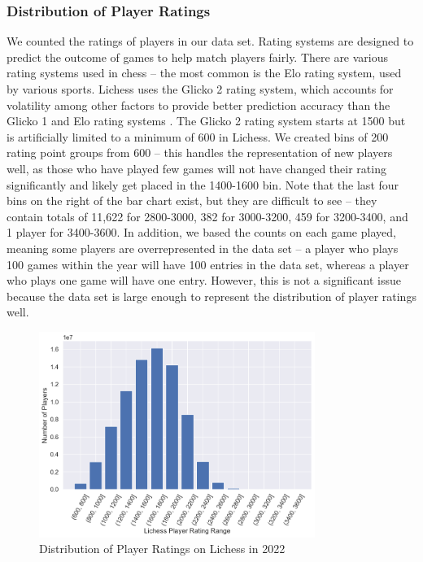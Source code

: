 \documentclass[a4paper, 11pt]{article}
\begin{document}
\subsubsection{Distribution of Player Ratings}
We counted the ratings of players in our data set. Rating systems are designed to predict the outcome of games to help match players fairly. There are various rating systems used in chess -- the most common is the Elo rating system, used by various sports. Lichess uses the Glicko 2 rating system, which accounts for volatility among other factors to provide better prediction accuracy than the Glicko 1 and Elo rating systems \cite{chessRatingSystems, DeloitteFIDEChessRatingChallenge}. The Glicko 2 rating system starts at 1500 but is artificially limited to a minimum of 600 in Lichess. We created bins of 200 rating point groups from 600 -- this handles the representation of new players well, as those who have played few games will not have changed their rating significantly and likely get placed in the 1400-1600 bin. Note that the last four bins on the right of the bar chart exist, but they are difficult to see -- they contain totals of 11,622 for 2800-3000, 382 for 3000-3200, 459 for 3200-3400, and 1 player for 3400-3600. In addition, we based the counts on each game played, meaning some players are overrepresented in the data set -- a player who plays 100 games within the year will have 100 entries in the data set, whereas a player who plays one game will have one entry. However, this is not a significant issue because the data set is large enough to represent the distribution of player ratings well.

\begin{figure}[H]
    \centering
    \caption{Distribution of Player Ratings on Lichess in 2022}
    \label{fig:distributionOfPlayerRatings}
    \includegraphics[width=0.8\textwidth]{Distribution of Player Ratings.png}
\end{figure}
\end{document}
